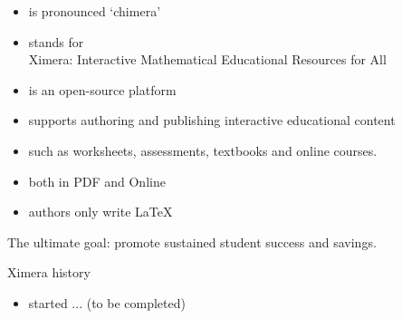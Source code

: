 \begin{frame}[t]{\Large{}}

  \begin{itemize}
  \item is pronounced \lq chimera\rq
  \item stands for \\
     {\Large\blue X}imera: {\Large\blue I}nteractive {\Large\blue M}athematical {\Large\blue E}ducational {\Large\blue R}esources for {\Large\blue A}ll
  \item is an open-source platform 
  \item supports authoring and publishing interactive educational content
  \item such as worksheets, assessments, textbooks and online courses. 
  \item both in PDF and Online
  \item authors only write \LaTeX %
  \end{itemize}
   
  \vfill

  The ultimate goal: promote sustained student success and savings.
  
  

\end{frame}

\begin{frame}[t]{Ximera history}

  \begin{itemize}
  \item started ... (to be completed)
  

  \end{itemize}
\end{frame}


